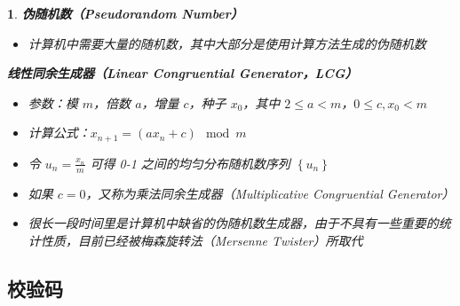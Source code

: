 \documentclass[UTF8]{report}
\theoremstyle{MyLineTheoremStyle} %
\theoremstyle{MyBlockTheoremStyle} %
\theoremstyle{MySubsubsectionStyle} %
\newtheorem{definition}{}
\begin{document}
\begin{definition}
    \textbf{伪随机数（Pseudorandom Number）}
    \begin{itemize}
        \item 计算机中需要大量的随机数，其中大部分是使用计算方法生成的伪随机数
    \end{itemize}

    \textbf{线性同余生成器（Linear Congruential Generator，LCG）}
    \begin{itemize}
        \item 参数：模 $m$，倍数 $a$，增量 $c$，种子 $x_0$，其中 $2 \leq a < m$，$0 \leq c, x_0 < m$
        \item 计算公式：$x_{n+1} = (ax_n + c) \mod m$
        \item 令 $u_n = \frac{x_n}{m}$ 可得 0-1 之间的均匀分布随机数序列 $\left\{u_n\right\}$
        \item 如果 $c = 0$，又称为乘法同余生成器（Multiplicative Congruential Generator）
        \item 很长一段时间里是计算机中缺省的伪随机数生成器，由于不具有一些重要的统计性质，目前已经被梅森旋转法（Mersenne Twister）所取代
    \end{itemize}
\end{definition}

\subsection{校验码}
\end{document}

